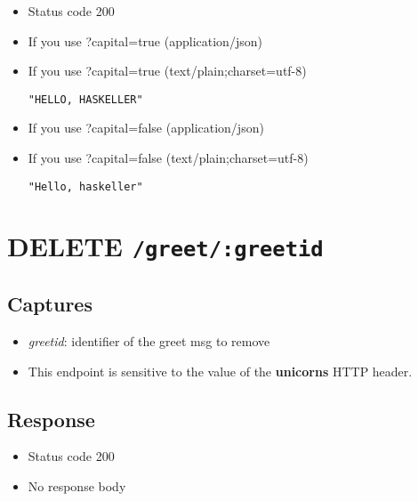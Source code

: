 \begin{itemize}
\itemsep1pt\parskip0pt
\item
  Status code 200
\item
  If you use ?capital=true (application/json)

\begin{Shaded}
\begin{Highlighting}[]
\end{Highlighting}
\end{Shaded}
\item
  If you use ?capital=true (text/plain;charset=utf-8)

\begin{verbatim}
"HELLO, HASKELLER"
\end{verbatim}
\item
  If you use ?capital=false (application/json)

\begin{Shaded}
\begin{Highlighting}[]
\end{Highlighting}
\end{Shaded}
\item
  If you use ?capital=false (text/plain;charset=utf-8)

\begin{verbatim}
"Hello, haskeller"
\end{verbatim}
\end{itemize}

\section{\texorpdfstring{DELETE
\texttt{/greet/:greetid}}{DELETE /greet/:greetid}}

\subsection{Captures}

\begin{itemize}
\itemsep1pt\parskip0pt
\item
  \emph{greetid}: identifier of the greet msg to remove
\end{itemize}

\begin{itemize}
\item
  This endpoint is sensitive to the value of the \textbf{unicorns} HTTP
  header.
\end{itemize}

\subsection{Response}

\begin{itemize}
\itemsep1pt\parskip0pt
\item
  Status code 200
\item
  No response body
\end{itemize}
